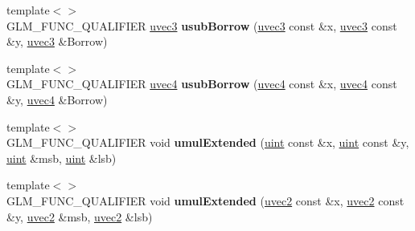\begin{DoxyCompactItemize}
\item 
{\footnotesize template$<$$>$ }\\G\+L\+M\+\_\+\+F\+U\+N\+C\+\_\+\+Q\+U\+A\+L\+I\+F\+I\+ER \hyperlink{group__core__types_gac4ba593917841b859ba1683b8b52b8fa}{uvec3} {\bfseries usub\+Borrow} (\hyperlink{group__core__types_gac4ba593917841b859ba1683b8b52b8fa}{uvec3} const \&x, \hyperlink{group__core__types_gac4ba593917841b859ba1683b8b52b8fa}{uvec3} const \&y, \hyperlink{group__core__types_gac4ba593917841b859ba1683b8b52b8fa}{uvec3} \&Borrow)\hypertarget{namespaceglm_a3cc22c141f42fb9faf42adb6cb124bb7}{}\label{namespaceglm_a3cc22c141f42fb9faf42adb6cb124bb7}

\item 
{\footnotesize template$<$$>$ }\\G\+L\+M\+\_\+\+F\+U\+N\+C\+\_\+\+Q\+U\+A\+L\+I\+F\+I\+ER \hyperlink{group__core__types_ga1c426d19627b32b14f0089f7f4ba7b1d}{uvec4} {\bfseries usub\+Borrow} (\hyperlink{group__core__types_ga1c426d19627b32b14f0089f7f4ba7b1d}{uvec4} const \&x, \hyperlink{group__core__types_ga1c426d19627b32b14f0089f7f4ba7b1d}{uvec4} const \&y, \hyperlink{group__core__types_ga1c426d19627b32b14f0089f7f4ba7b1d}{uvec4} \&Borrow)\hypertarget{namespaceglm_a766d4ebce0a5f042f79787ef32862bb4}{}\label{namespaceglm_a766d4ebce0a5f042f79787ef32862bb4}

\item 
{\footnotesize template$<$$>$ }\\G\+L\+M\+\_\+\+F\+U\+N\+C\+\_\+\+Q\+U\+A\+L\+I\+F\+I\+ER void {\bfseries umul\+Extended} (\hyperlink{group__core__precision_ga4fd29415871152bfb5abd588334147c8}{uint} const \&x, \hyperlink{group__core__precision_ga4fd29415871152bfb5abd588334147c8}{uint} const \&y, \hyperlink{group__core__precision_ga4fd29415871152bfb5abd588334147c8}{uint} \&msb, \hyperlink{group__core__precision_ga4fd29415871152bfb5abd588334147c8}{uint} \&lsb)\hypertarget{namespaceglm_a656a4eb28952b733f8611d6a5e98472f}{}\label{namespaceglm_a656a4eb28952b733f8611d6a5e98472f}

\item 
{\footnotesize template$<$$>$ }\\G\+L\+M\+\_\+\+F\+U\+N\+C\+\_\+\+Q\+U\+A\+L\+I\+F\+I\+ER void {\bfseries umul\+Extended} (\hyperlink{group__core__types_gafd2041b45eff671aa8899d2c2835eee9}{uvec2} const \&x, \hyperlink{group__core__types_gafd2041b45eff671aa8899d2c2835eee9}{uvec2} const \&y, \hyperlink{group__core__types_gafd2041b45eff671aa8899d2c2835eee9}{uvec2} \&msb, \hyperlink{group__core__types_gafd2041b45eff671aa8899d2c2835eee9}{uvec2} \&lsb)\hypertarget{namespaceglm_a0e0e684a25e4d67be3532c7059eb366c}{}\label{namespaceglm_a0e0e684a25e4d67be3532c7059eb366c}


\end{DoxyCompactItemize}
